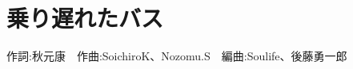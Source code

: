 \section{乗り遅れたバス}

\begin{center}
    \scriptsize{
        作詞:秋元康　作曲:SoichiroK、Nozomu.S　編曲:Soulife、後藤勇一郎
    }
\end{center}

\vspace{0.7em}

\begin{Parallel}[c]{0.47\textwidth}{0.47\textwidth}

\ParallelLText{
    \footnotesize{
        
    }
}

\ParallelRText{
    \footnotesize{
        
    }
}

\end{Parallel} 